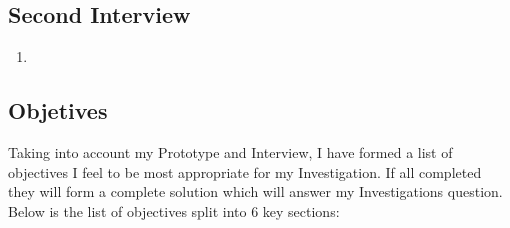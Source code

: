 \begin{flushleft}
        \subsection{Second Interview}
            
            \vspace{0.2cm}

            \begin{enumerate}
                \item 
            \end{enumerate}

            \pagebreak

        \subsection{Objetives}
            \large
            Taking into account my Prototype and Interview, I have formed a list of objectives I feel to be most 
            appropriate for my Investigation.
            If all completed they will form a complete solution which will answer my Investigations question.
            Below is the list of objectives split into 6 key sections:


\end{flushleft}
